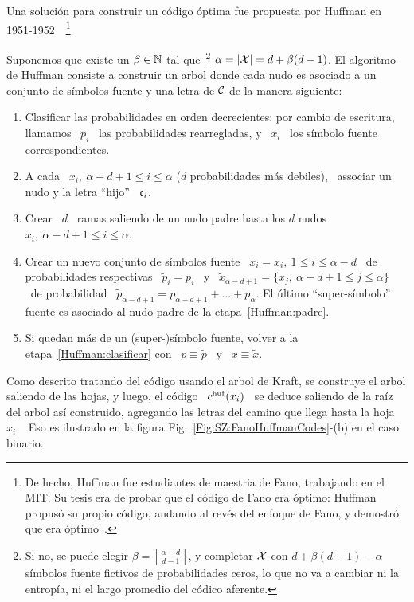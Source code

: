 Una soluci\'on para construir un  c\'odigo \'optima fue propuesta por Huffman en
1951-1952~\cite{Huf52,  Pig03}~\footnote{De hecho,  Huffman  fue estudiantes  de
  maestria  de Fano,  trabajando  en el  MIT.  Su  tesis  era de  probar que  el
  c\'odigo de Fano  era \'optimo: Huffman propus\'o su  propio c\'odigo, andando
  al rev\'es del enfoque de Fano, y demostr\'o que era \'optimo~\cite{Sti91}.}
%
\begin{definicion}
\label{Def:SZ:HuffmanCode}
%
  Suponemos que  existe un $\beta \in  \mathbb{N}$ tal que~\footnote{Si  no, se puede
    elegir $\beta =  \left\lceil \frac{\alpha-d}{d-1} \right\rceil$, y completar
    $\mathcal{X}$  con  $d  +  \beta  (d-1)  -  \alpha$  s\'imbolos  fuente  fictivos  de
    probabilidades ceros, lo  que no va a cambiar ni la  entrop\'ia, ni el largo
    promedio del  c\'odico aferente.}   $\alpha =  |\mathcal{X}| = d  + \beta  (d-1)$. El
  algoritmo de Huffman consiste a construir un arbol donde cada nudo es asociado
  a un conjunto de s\'imbolos fuente y una letra de $\mathcal{C}$ de la manera siguiente:
  \begin{enumerate}
  \item\label{Huffman:clasificar}   Clasificar  las   probabilidades   en  orden
    decrecientes: por cambio de escritura, llamamos \ $p_i$ \ las probabilidades
    rearregladas, y \ $x_i$ \ los s\'imbolo fuente correspondientes.
  \item\label{Huffman:codigolocal}  A  cada \  $x_i,  \:  \alpha-d+1  \le i  \le
    \alpha$ ($d$  probabilidades m\'as debiles), \  associar un nudo  y la letra
    ``hijo'' \ $\mathfrak{c}_i$.
  \item\label{Huffman:padre} Crear \ $d$ \ ramas saliendo de un nudo padre hasta
    los $d$ nudos $x_i, \: \alpha-d+1 \le i \le \alpha$.
  \item\label{Huffman:reconfiguracion}  Crear un  nuevo  conjunto de  s\'imbolos
    fuente  \  $\widetilde{x}_i   =  x_i,  \:  1  \le  i   \le  \alpha-d$  \  de
    probabilidades   respectivas    \   $\widetilde{p}_i   =   p_i$    \   y   \
    $\widetilde{x}_{\alpha-d+1} = \{  x_j, \: \alpha-d+1 \le j  \le \alpha \}$ \
    de probabilidad  \ $\widetilde{p}_{\alpha-d+1}  = p_{\alpha-d+1} +  \ldots +
    p_\alpha$.  El \'ultimo ``super-s\'imbolo'' fuente es asociado al nudo padre
    de la etapa~\ref{Huffman:padre}.
  \item  Si   quedan  m\'as  de   un  (super-)s\'imbolo  fuente,  volver   a  la
    etapa~\ref{Huffman:clasificar}  con \  $p  \equiv \widetilde{p}$  \  y \  $x
    \equiv \widetilde{x}$.
  \end{enumerate}
  Como descrito tratando del c\'odigo usando  el arbol de Kraft, se construye el
  arbol saliendo de las hojas, y  luego, el c\'odigo \ $c^{\mathrm{huf}}(x_i)$ \ se deduce
  saliendo de  la ra\'iz  del arbol as\'i  construido, agregando las  letras del
  camino que  llega hasta  la hoja  \ $x_i$.  \  Eso es  ilustrado en  la figura
  Fig.~\ref{Fig:SZ:FanoHuffmanCodes}-(b) en el caso binario.
\end{definicion}
